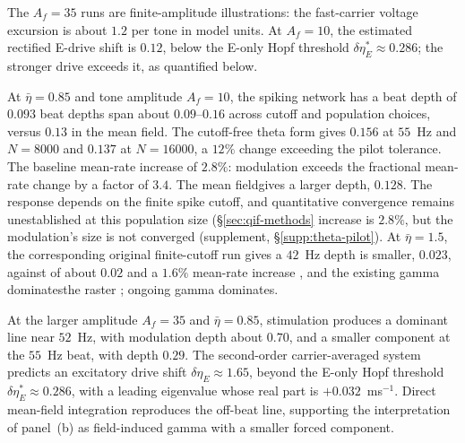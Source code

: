 \documentclass[11pt,a4paper]{article}
\providecommand{\DIFaddtex}[1]{{\protect\color{blue} \sf #1}} %
\providecommand{\DIFdeltex}[1]{{\protect\color{red} \scriptsize #1}} %
\providecommand{\DIFaddbegin}{} %
\providecommand{\DIFaddend}{} %
\providecommand{\DIFdelbegin}{} %
\providecommand{\DIFdelend}{} %
\providecommand{\DIFadd}[1]{\texorpdfstring{\DIFaddtex{#1}}{#1}} %
\providecommand{\DIFdel}[1]{\texorpdfstring{\DIFdeltex{#1}}{}} %
\begin{document}
The $A_f=35$ runs are finite-amplitude illustrations: the fast-carrier voltage
excursion is about $1.2$ per tone in model units. At $A_f=10$, the estimated
rectified E-drive shift is $0.12$, below the E-only Hopf threshold
$\delta\eta_E^*\approx0.286$; the stronger drive exceeds it, as quantified below.

At $\bar\eta=0.85$ and \DIFdelbegin \DIFdel{tone amplitude }\DIFdelend $A_f=10$, \DIFdelbegin \DIFdel{the spiking network has a beat depth of $0.093$ }\DIFdelend \DIFaddbegin \DIFadd{beat depths span about $0.09$--$0.16$
across cutoff and population choices, versus $0.13$ in the mean field.
The cutoff-free theta form gives $0.156$ }\DIFaddend at \DIFdelbegin \DIFdel{$55$~Hz and }\DIFdelend \DIFaddbegin \DIFadd{$N=8000$ and $0.137$ at
$N=16000$, }\DIFaddend a \DIFaddbegin \DIFadd{$12\%$ change exceeding the pilot tolerance. The baseline
}\DIFaddend mean-rate \DIFdelbegin \DIFdel{increase of $2.8\%$: modulation exceeds
the fractional mean-rate change by a factor of $3.4$. The mean fieldgives a
larger depth, $0.128$. The response depends on the finite spike cutoff, and quantitative convergence
remains unestablished at this population size (\S\ref{sec:qif-methods}}\DIFdelend \DIFaddbegin \DIFadd{increase is $2.8\%$, but the modulation's size is not converged
(supplement, \S\ref{supp:theta-pilot}}\DIFaddend ). At $\bar\eta=1.5$, the \DIFdelbegin \DIFdel{corresponding }\DIFdelend \DIFaddbegin \DIFadd{original
finite-cutoff run gives a }\DIFaddend $42$~Hz depth \DIFdelbegin \DIFdel{is smaller, $0.023$, against }\DIFdelend \DIFaddbegin \DIFadd{of about $0.02$ and }\DIFaddend a $1.6\%$
mean-rate increase\DIFdelbegin \DIFdel{, and the existing gamma dominatesthe raster}\DIFdelend \DIFaddbegin \DIFadd{; ongoing gamma dominates}\DIFaddend .

At the larger amplitude $A_f=35$ and $\bar\eta=0.85$, stimulation produces
a dominant line near $52$~Hz, with modulation depth about $0.70$, and a smaller component
at the $55$~Hz beat, with depth $0.29$. The second-order carrier-averaged system
predicts an excitatory drive shift $\delta\eta_E\approx1.65$, beyond the E-only
Hopf threshold $\delta\eta_E^*\approx0.286$, with a leading eigenvalue whose real
part is $+0.032$~ms$^{-1}$. Direct mean-field integration reproduces the off-beat
line, supporting the interpretation of panel~(b) as field-induced gamma with a
smaller forced component.
\end{document}
